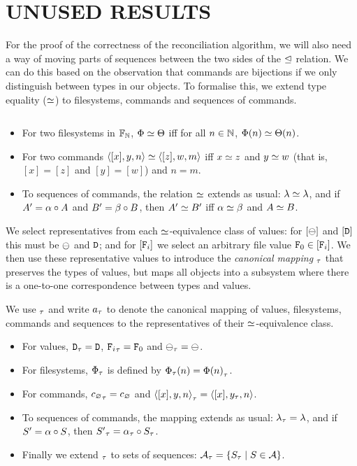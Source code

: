 \section{UNUSED RESULTS}


\noindent
For the proof of the correctness of the reconciliation algorithm,
we will also need a way of moving parts of sequences between the two
sides of the $\trianglelefteq$ relation.
We can do this based on the observation that commands are bijections
if we only distinguish between types in our objects.
To formalise this, we extend type equality ($\simeq$)
to filesystems, commands and sequences of commands.
\begin{mydef}
$ $ %
\begin{itemize}
\item For two filesystems in $\mathbb{F}_{\mathbb{N}}$, $\Phi\simeq\Theta$ iff
for all $n\in\mathbb{N}$, $\Phi(n) \simeq \Theta(n)$.
\item For two commands $\langle{[x],y,n}\rangle\simeq\langle{[z],w,m}\rangle$ iff 
$x\simeq z$ and $y\simeq w$
(that is, $[x]=[z]$ and $[y]=[w]$)
and $n=m$.
\item To sequences of commands, the relation $\simeq$ extends as usual: $\lambda\simeq\lambda$, and
if $A'=\alpha\circ A$ and $B'=\beta\circ B$, then $A'\simeq B'$ iff $\alpha\simeq\beta$ and $A\simeq B$.
\end{itemize}
\end{mydef}

We select representatives from each $\simeq$-equivalence class of values:
for $[\ominus]$ and $[\mathtt{D}]$ this must be $\ominus$ and $\mathtt{D}$; and
for $[\mathtt{F}_i]$ we select an arbitrary file value $\mathtt{F}_0\in[\mathtt{F}_i]$.
We then use these representative values to
introduce the \emph{canonical mapping} ${}_\tau$ that preserves the types of values,
but maps all objects into a subsystem where there is a one-to-one
correspondence between types and values.

\begin{mydef}\label{def_typemapping}
We use ${}_\tau$ and write ${a}_\tau$ to denote the canonical mapping of 
values, filesystems, commands and sequences to the
representatives of their $\simeq$-equivalence class.
\begin{itemize}
\item For values, ${\mathtt{D}}_\tau=\mathtt{D}$, ${\mathtt{F}_i}_\tau=\mathtt{F}_0$ and ${\ominus}_\tau=\ominus$.
\item For filesystems, ${\Phi}_\tau$ is defined by ${\Phi}_\tau(n) = {\Phi(n)}_\tau$.
\item For commands, ${c_\varnothing}_\tau=c_\varnothing$ and ${\langle{[x],y,n}\rangle}_\tau = \langle{[{x}],{y}_\tau,{n}}\rangle$.
\item To sequences of commands, the mapping extends as usual: ${\lambda}_\tau=\lambda$, and if $S'=\alpha\circ S$, then ${S'}_\tau={\alpha}_\tau\circ {S}_\tau$.
\item Finally we extend ${}_\tau$ to sets of sequences: ${\mathcal{A}}_\tau = \{{S}_\tau \mathrel{|} S\in\mathcal{A}\}$.
\end{itemize}
\end{mydef}

